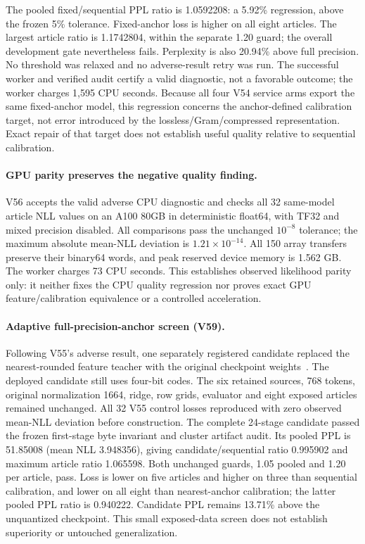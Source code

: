 \documentclass[10pt,twocolumn,letterpaper]{article}
\begin{document}
The pooled fixed/sequential PPL ratio is 1.0592208: a 5.92\% regression, above
the frozen 5\% tolerance. Fixed-anchor loss is higher on all eight articles.
The largest article ratio is 1.1742804, within the separate 1.20 guard; the
overall development gate nevertheless fails. Perplexity is also 20.94\%
above full precision. No threshold was relaxed and no adverse-result retry
was run. The successful worker and verified audit certify a valid diagnostic,
not a favorable outcome; the worker charges 1,595 CPU seconds.
Because all four V54 service arms export the same fixed-anchor model, this
regression concerns the anchor-defined calibration target, not error introduced
by the lossless/Gram/compressed representation. Exact repair of that target
does not establish useful quality relative to sequential calibration.

\paragraph{GPU parity preserves the negative quality finding.}
V56 accepts the valid adverse CPU diagnostic and checks all 32 same-model
article NLL values on an A100 80GB in deterministic float64, with TF32 and
mixed precision disabled. All comparisons pass the unchanged $10^{-8}$
tolerance; the maximum absolute mean-NLL deviation is $1.21\times10^{-14}$.
All 150 array transfers preserve their binary64 words, and peak reserved device
memory is 1.562 GB. The worker charges 73 CPU seconds. This establishes observed
likelihood parity only: it neither fixes the CPU quality regression nor proves
exact GPU feature/calibration equivalence or a controlled acceleration.

\paragraph{Adaptive full-precision-anchor screen (V59).}
Following V55's adverse result, one separately registered candidate replaced the
nearest-rounded feature teacher with the original checkpoint weights~\cite{v59terminal}.
The deployed candidate still uses four-bit codes. The six retained sources,
768 tokens, original normalization 1664, ridge, row grids, evaluator and eight
exposed articles remained unchanged. All 32 V55 control losses reproduced with
zero observed mean-NLL deviation before construction. The complete 24-stage
candidate passed the frozen first-stage byte invariant and cluster artifact audit.
Its pooled PPL is 51.85008 (mean NLL 3.948356), giving candidate/sequential ratio
0.995902 and maximum article ratio 1.065598. Both unchanged guards, 1.05 pooled
and 1.20 per article, pass. Loss is lower on five articles and higher on three
than sequential calibration, and lower on all eight than nearest-anchor
calibration; the latter pooled PPL ratio is 0.940222. Candidate PPL remains
13.71\% above the unquantized checkpoint. This small exposed-data screen does
not establish superiority or untouched generalization.
\end{document}
